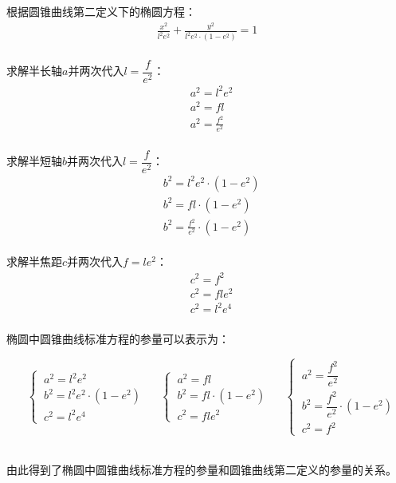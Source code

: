 \documentclass[UTF8]{ctexart}
\begin{document}
    根据圆锥曲线第二定义下的椭圆方程：
    \begin{align}
        \frac{x^2}{l^2e^2}+\frac{y^2}{l^2e^2\cdot\left(1-e^2\right)}=1
    \end{align}\\
    求解半长轴$a$并两次代入$l=\dfrac{f}{e^2}$：
    \begin{align}
        &a^2=l^2e^2\\[4mm]
        &a^2=fl\\[4mm]
        &a^2=\frac{f^2}{e^2}
    \end{align}\\
    求解半短轴$b$并两次代入$l=\dfrac{f}{e^2}$：
    \begin{align}
        &b^2=l^2e^2\cdot(1-e^2)\\[4mm]
        &b^2=fl\cdot(1-e^2)\\[4mm]
        &b^2=\frac{f^2}{e^2}\cdot\left(1-e^2\right)
    \end{align}\\
    求解半焦距$c$并两次代入$f=le^2$：
    \begin{align}
        &c^2=f^2\\[4mm]
        &c^2=fle^2\\[4mm]
        &c^2=l^2e^4
    \end{align}\\
    椭圆中圆锥曲线标准方程的参量可以表示为：\vspace{5pt}
    \begin{large}
        \begin{equation*}
            ~~~~
            \begin{cases}
                ~a^2=l^2e^2\\[5mm]
                ~b^2=l^2e^2\cdot\left(1-e^2\right)\\[5mm]
                ~c^2=l^2e^4
            \end{cases}~~~~~~
            \begin{cases}
                ~a^2=fl\\[5mm]
                ~b^2=fl\cdot\left(1-e^2\right)\\[5mm]
                ~c^2=fle^2
            \end{cases}~~~~~~
            \begin{cases}
                ~a^2=\dfrac{f^2}{e^2}\\[5mm]
                ~b^2=\dfrac{f^2}{e^2}\cdot\left(1-e^2\right)\\[5mm]
                ~c^2=f^2
            \end{cases}
        \end{equation*}
    \end{large}\\
    由此得到了椭圆中圆锥曲线标准方程的参量和圆锥曲线第二定义的参量的关系。
\end{document}
